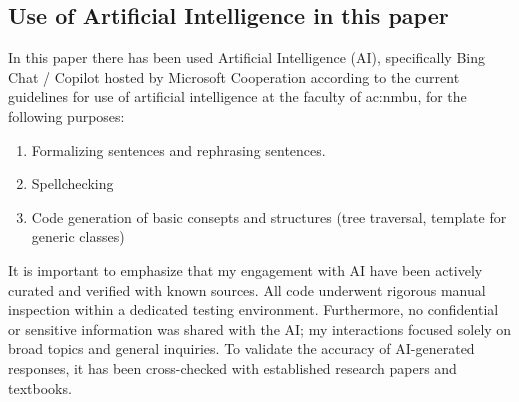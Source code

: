 \subsection[Use of AI]{Use of Artificial Intelligence in this paper}

In this paper there has been used Artificial Intelligence (AI), specifically Bing Chat / Copilot hosted by Microsoft Cooperation according to the current guidelines for use of artificial intelligence at the faculty of \acrfull{ac:nmbu}, for the following purposes:

\begin{enumerate}
	\item Formalizing sentences and rephrasing sentences.
	\item Spellchecking
	\item Code generation of basic consepts and structures (tree traversal, template for generic classes) 
\end{enumerate}

It is important to emphasize that my engagement with AI have been actively curated and verified with known sources. All code underwent rigorous manual inspection within a dedicated testing environment. Furthermore, no confidential or sensitive information was shared with the AI; my interactions focused solely on broad topics and general inquiries. To validate the accuracy of AI-generated responses, it has been cross-checked with established research papers and textbooks.
